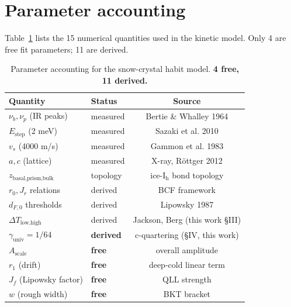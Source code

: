 \documentclass[aps,prb,reprint,superscriptaddress]{revtex4-2}
\begin{document}
\section{Parameter accounting}

Table~\ref{tab:params} lists the 15 numerical quantities used in the
kinetic model.  Only 4 are free fit parameters; 11 are derived.

\begin{table}[h]
\centering
\begin{tabular}{llc}\toprule
Quantity & Status & Source \\
\midrule
$\nu_b, \nu_p$ (IR peaks)   & measured  & Bertie \& Whalley 1964 \\
$E_\text{step}$ (2 meV)     & measured  & Sazaki et al. 2010 \\
$v_s$ (4000 m/s)            & measured  & Gammon et al. 1983 \\
$a, c$ (lattice)            & measured  & X-ray, Röttger 2012 \\
$z_\text{basal,prism,bulk}$ & topology  & ice-I$_\text{h}$ bond topology \\
$r_0, J_r$ relations        & derived   & BCF framework \\
$d_{F,0}$ thresholds        & derived   & Lipowsky 1987 \\
$\Delta T_\text{low,high}$  & derived   & Jackson, Berg (this work §III) \\
$\gamma_\text{univ} = 1/64$ & \textbf{derived} & c-quartering (§IV, this work) \\
\midrule
$A_\text{scale}$            & \textbf{free}   & overall amplitude \\
$r_1$ (drift)               & \textbf{free}   & deep-cold linear term \\
$J_f$ (Lipowsky factor)     & \textbf{free}   & QLL strength \\
$w$ (rough width)           & \textbf{free}   & BKT bracket \\
\bottomrule
\end{tabular}
\caption{Parameter accounting for the snow-crystal habit model.
\textbf{4 free, 11 derived.}}
\label{tab:params}
\end{table}
\end{document}
